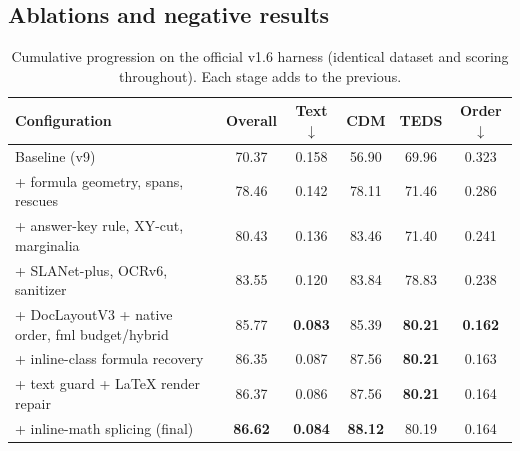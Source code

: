 \subsection{Ablations and negative results}
\label{sec:ablations}

\begin{table}[t]
\centering
\caption{Cumulative progression on the official v1.6 harness (identical dataset and scoring throughout). Each stage adds to the previous.}
\label{tab:ablation}
\small
\setlength{\tabcolsep}{4pt}
\begin{tabular}{lccccc}
\toprule
Configuration & Overall & Text$\downarrow$ & CDM & TEDS & Order$\downarrow$ \\
\midrule
Baseline (v9) & 70.37 & 0.158 & 56.90 & 69.96 & 0.323 \\
+ formula geometry, spans, rescues & 78.46 & 0.142 & 78.11 & 71.46 & 0.286 \\
+ answer-key rule, XY-cut, marginalia & 80.43 & 0.136 & 83.46 & 71.40 & 0.241 \\
+ SLANet-plus, OCRv6, sanitizer & 83.55 & 0.120 & 83.84 & 78.83 & 0.238 \\
+ DocLayoutV3 + native order, fml budget/hybrid & 85.77 & \textbf{0.083} & 85.39 & \textbf{80.21} & \textbf{0.162} \\
+ inline-class formula recovery & 86.35 & 0.087 & 87.56 & \textbf{80.21} & 0.163 \\
+ text guard + \LaTeX{} render repair & 86.37 & 0.086 & 87.56 & \textbf{80.21} & 0.164 \\
+ inline-math splicing (final) & \textbf{86.62} & \textbf{0.084} & \textbf{88.12} & 80.19 & 0.164 \\
\bottomrule
\end{tabular}
\end{table}

